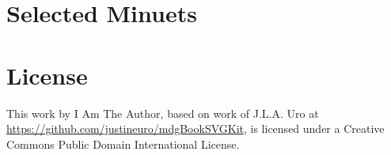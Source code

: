 \documentclass[letterpaper,x11names,svgnames,10pt]{article}
\begin{document}
\newpage
\section{Selected Minuets}
\vspace{-0.20in}
{
\topmargin -0.75in
\textheight 9.15in
	
}	

\section{License}
This work by I Am The Author, based on work of J.L.A. Uro at \url{https://github.com/justineuro/mdgBookSVGKit}, is licensed under a Creative Commons Public Domain International License.




 
\end{document}
